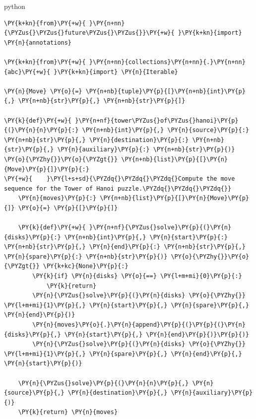 \documentclass[a4paper,twoside]{article}
\begin{document}
\begin{code}{python}{}{}
\begin{Verbatim}[commandchars=\\\{\},breaklines, breakanywhere, commandchars=\\\{\}]
\PY{k+kn}{from}\PY{+w}{ }\PY{n+nn}{\PYZus{}\PYZus{}future\PYZus{}\PYZus{}}\PY{+w}{ }\PY{k+kn}{import} \PY{n}{annotations}

\PY{k+kn}{from}\PY{+w}{ }\PY{n+nn}{collections}\PY{n+nn}{.}\PY{n+nn}{abc}\PY{+w}{ }\PY{k+kn}{import} \PY{n}{Iterable}

\PY{n}{Move} \PY{o}{=} \PY{n+nb}{tuple}\PY{p}{[}\PY{n+nb}{int}\PY{p}{,} \PY{n+nb}{str}\PY{p}{,} \PY{n+nb}{str}\PY{p}{]}

\PY{k}{def}\PY{+w}{ }\PY{n+nf}{tower\PYZus{}of\PYZus{}hanoi}\PY{p}{(}\PY{n}{n}\PY{p}{:} \PY{n+nb}{int}\PY{p}{,} \PY{n}{source}\PY{p}{:} \PY{n+nb}{str}\PY{p}{,} \PY{n}{destination}\PY{p}{:} \PY{n+nb}{str}\PY{p}{,} \PY{n}{auxiliary}\PY{p}{:} \PY{n+nb}{str}\PY{p}{)} \PY{o}{\PYZhy{}}\PY{o}{\PYZgt{}} \PY{n+nb}{list}\PY{p}{[}\PY{n}{Move}\PY{p}{]}\PY{p}{:}
\PY{+w}{    }\PY{l+s+sd}{\PYZdq{}\PYZdq{}\PYZdq{}Compute the move sequence for the Tower of Hanoi puzzle.\PYZdq{}\PYZdq{}\PYZdq{}}
    \PY{n}{moves}\PY{p}{:} \PY{n+nb}{list}\PY{p}{[}\PY{n}{Move}\PY{p}{]} \PY{o}{=} \PY{p}{[}\PY{p}{]}

    \PY{k}{def}\PY{+w}{ }\PY{n+nf}{\PYZus{}solve}\PY{p}{(}\PY{n}{disks}\PY{p}{:} \PY{n+nb}{int}\PY{p}{,} \PY{n}{start}\PY{p}{:} \PY{n+nb}{str}\PY{p}{,} \PY{n}{end}\PY{p}{:} \PY{n+nb}{str}\PY{p}{,} \PY{n}{spare}\PY{p}{:} \PY{n+nb}{str}\PY{p}{)} \PY{o}{\PYZhy{}}\PY{o}{\PYZgt{}} \PY{k+kc}{None}\PY{p}{:}
        \PY{k}{if} \PY{n}{disks} \PY{o}{==} \PY{l+m+mi}{0}\PY{p}{:}
            \PY{k}{return}
        \PY{n}{\PYZus{}solve}\PY{p}{(}\PY{n}{disks} \PY{o}{\PYZhy{}} \PY{l+m+mi}{1}\PY{p}{,} \PY{n}{start}\PY{p}{,} \PY{n}{spare}\PY{p}{,} \PY{n}{end}\PY{p}{)}
        \PY{n}{moves}\PY{o}{.}\PY{n}{append}\PY{p}{(}\PY{p}{(}\PY{n}{disks}\PY{p}{,} \PY{n}{start}\PY{p}{,} \PY{n}{end}\PY{p}{)}\PY{p}{)}
        \PY{n}{\PYZus{}solve}\PY{p}{(}\PY{n}{disks} \PY{o}{\PYZhy{}} \PY{l+m+mi}{1}\PY{p}{,} \PY{n}{spare}\PY{p}{,} \PY{n}{end}\PY{p}{,} \PY{n}{start}\PY{p}{)}

    \PY{n}{\PYZus{}solve}\PY{p}{(}\PY{n}{n}\PY{p}{,} \PY{n}{source}\PY{p}{,} \PY{n}{destination}\PY{p}{,} \PY{n}{auxiliary}\PY{p}{)}
    \PY{k}{return} \PY{n}{moves}


\end{Verbatim}
\end{code}
\end{document}
